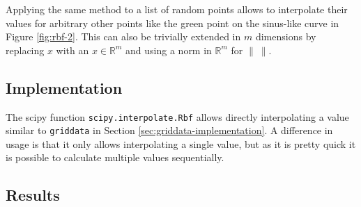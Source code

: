 Applying the same method to a list of random points allows to interpolate their values for arbitrary other points like the green point on the sinus-like curve in Figure \ref{fig:rbf-2}. This can also be trivially extended in $m$ dimensions by replacing $x$ with an $x\in\mathbb{R}^m$ and using a norm in $\mathbb{R}^m$ for $\left\|\ \right\|$.

\subsection{Implementation}

The scipy function \texttt{scipy.interpolate.Rbf} allows directly interpolating a value similar to \texttt{griddata} in Section \ref{sec:griddata-implementation}. A difference in usage is that it only allows interpolating a single value, but as it is pretty quick it is possible to calculate multiple values sequentially.

\subsection{Results}

